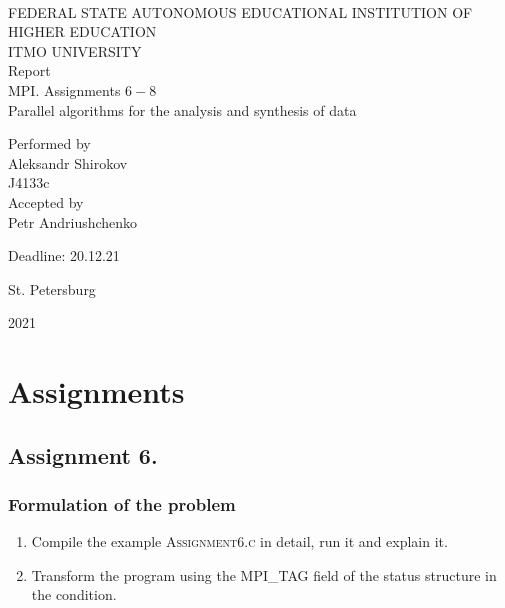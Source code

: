 \documentclass[%
12pt, %
final, %
oneside, %
onecolumn, %
centertags]{article} %
\theoremstyle{plain}
\theoremstyle{definition}
\theoremstyle{remark}
\begin{document}
	\begin{titlepage} 
		\begin{center}
		\textbf{}\\[2.0cm]
		\LARGE FEDERAL STATE AUTONOMOUS EDUCATIONAL INSTITUTION OF HIGHER EDUCATION \\[0.5cm]
		\Large ITMO UNIVERSITY \\[3cm]
		\LARGE Report\\
		\Large MPI. Assignments $6-8$ \\
		\Large Parallel algorithms for the analysis and synthesis of data \\[4cm]


		\begin{flushright}
		Performed by\\
		Aleksandr Shirokov\\
		J4133c\\
		Accepted by\\
		Petr Andriushchenko

		Deadline: 20.12.21
		\end{flushright}

		\vfill 

		{\Large {St. Petersburg}} \par
		{\Large {2021}}
		\end{center} 
	\end{titlepage}

\tableofcontents
\newpage


\section{Assignments}

\subsection{Assignment 6.}

\subsubsection{Formulation of the problem}

\begin{enumerate}
	\item Compile the example \textsc{Assignment6.c} in detail, run it and explain it.
	\item Transform the program using the \textsc{MPI\_TAG} field of the status structure in the 
condition.
\end{enumerate}
\end{document}

